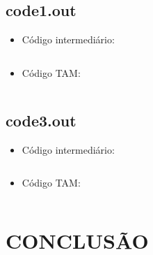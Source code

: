 \documentclass[12pt]{article}
\begin{document}
\subsection{code1.out}

\begin{itemize}
 \item Código intermediário:\\
 
  \begin{mdframed}[linecolor=black, leftline=false, rightline=false]
    \inputminted[linenos, fontsize=\footnotesize]{text}{../input/code1.out}
  \end{mdframed}
  
  \mbox{}
 
 \item Código TAM: \\
 
 \begin{mdframed}[linecolor=black, leftline=false, rightline=false]
    \inputminted[linenos, fontsize=\footnotesize]{text}{../output/code1.tam}
  \end{mdframed}
\end{itemize}

\subsection{code3.out}

\begin{itemize}
 \item Código intermediário: \\
 
  \begin{mdframed}[linecolor=black, leftline=false, rightline=false]
    \inputminted[linenos, fontsize=\footnotesize]{text}{../input/code3.out}
  \end{mdframed}
 
 \mbox{}
 
 \item Código TAM: \\
 
 \begin{mdframed}[linecolor=black, leftline=false, rightline=false]
    \inputminted[linenos, fontsize=\footnotesize]{text}{../output/code3.tam}
  \end{mdframed}
\end{itemize}


\section{CONCLUSÃO}
\end{document}
